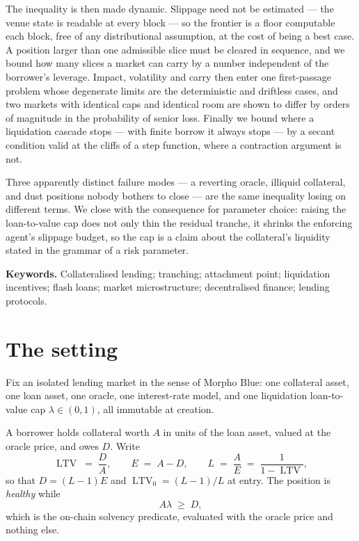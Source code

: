 \documentclass[11pt,a4paper]{article}
\theoremstyle{plain}
\theoremstyle{definition}
\theoremstyle{remark}
\DeclareMathOperator{\ltv}{LTV}
\begin{document}
The inequality is then made dynamic. Slippage need not be estimated --- the venue state is readable
at every block --- so the frontier is a floor computable each block, free of any distributional
assumption, at the cost of being a best case. A position larger than one admissible slice must be
cleared in sequence, and we bound how many slices a market can carry by a number independent of the
borrower's leverage. Impact, volatility and carry then enter one first-passage problem whose
degenerate limits are the deterministic and driftless cases, and two markets with identical caps
and identical room are shown to differ by orders of magnitude in the probability of senior loss.
Finally we bound where a liquidation cascade stops --- with finite borrow it always stops --- by a
secant condition valid at the cliffs of a step function, where a contraction argument is not.

Three apparently distinct failure modes --- a reverting oracle, illiquid collateral, and dust
positions nobody bothers to close --- are the same inequality losing on different terms. We close
with the consequence for parameter choice: raising the loan-to-value cap does not only thin the
residual tranche, it shrinks the enforcing agent's slippage budget, so the cap is a claim about the
collateral's liquidity stated in the grammar of a risk parameter.

\medskip
\noindent\textbf{Keywords.} Collateralised lending; tranching; attachment point; liquidation
incentives; flash loans; market microstructure; decentralised finance; lending protocols.

\newpage
\section{The setting}

Fix an isolated lending market in the sense of Morpho Blue: one collateral asset, one loan
asset, one oracle, one interest-rate model, and one liquidation loan-to-value cap
$\lambda \in (0,1)$, all immutable at creation.

A borrower holds collateral worth $A$ in units of the loan asset, valued at the oracle price,
and owes $D$. Write
\[
  \ltv \;=\; \frac{D}{A}, \qquad E \;=\; A-D, \qquad L \;=\; \frac{A}{E} \;=\; \frac{1}{1-\ltv},
\]
so that $D = (L-1)E$ and $\ltv_0 = (L-1)/L$ at entry. The position is \emph{healthy} while
\begin{equation}\label{eq:healthy}
  A\lambda \;\geq\; D,
\end{equation}
which is the on-chain solvency predicate, evaluated with the oracle price and nothing else.
\end{document}
